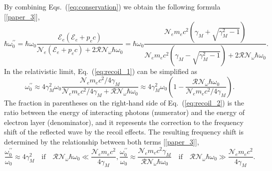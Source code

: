 \documentclass[10pt, a4paper, twoside, openright]{report}
\begin{document}
By combining Eqs.~(\ref{eq:conservation}) we obtain the following formula [\ref{paper_3}],
\begin{equation}\label{eq:recoil_1}
\hbar \omega_0^{\prime \prime} = \hbar \omega_0 \frac{\mathcal{E}_e \left( \mathcal{E}_e + p_e c \right)}{\mathcal{N}_e \left( \mathcal{E}_e + p_e c \right) + 2 \mathcal{R} \mathcal{N}_{\omega} \hbar \omega_0} = \hbar \omega_0 \frac{\mathcal{N}_e m_e c^2 \left( \gamma_M + \sqrt{\gamma_M^2 - 1} \right)}{\mathcal{N}_e m_e c^2 \left( \gamma_M - \sqrt{\gamma_M^2 - 1} \right) + 2 \mathcal{R} \mathcal{N}_{\omega} \hbar \omega_0}.
\end{equation}
In the relativistic limit, Eq.~(\ref{eq:recoil_1}) can be simplified as
\begin{equation}\label{eq:recoil_2}
\omega_0^{\prime \prime} \approx 4 \gamma_M^2 \omega_0 \frac{\mathcal{N}_e m_e c^2 / 4 \gamma_M}{\mathcal{N}_e m_e c^2 / 4 \gamma_M + \mathcal{R} \mathcal{N}_{\omega} \hbar \omega_0} \approx 4 \gamma_M^2 \omega_0 \left( 1 - \frac{\mathcal{R} \mathcal{N}_{\omega} \hbar \omega_0}{\mathcal{N}_e m_e c^2 / 4 \gamma_M} \right).
\end{equation}
The fraction in parentheses on the right-hand side of Eq.~(\ref{eq:recoil_2}) is the ratio between the energy of interacting photons (numerator) and the energy of electron layer (denominator), and it represents the correction to the frequency shift of the reflected wave by the recoil effects. The resulting frequency shift is determined by the relationship between both terms [\ref{paper_3}],
\begin{subequations}
\begin{equation}\label{eq:recoil_limit_1}
\frac{\omega_0^{\prime \prime}}{\omega_0} \approx 4 \gamma_M^2 \quad \mathrm{if} \quad \mathcal{R} \mathcal{N}_{\omega} \hbar \omega_0 \ll \frac{\mathcal{N}_e m_e c^2}{4 \gamma_M},
\end{equation}
\begin{equation}\label{eq:recoil_limit_2}
\frac{\omega_0^{\prime \prime}}{\omega_0} \approx \frac{\mathcal{N}_e m_e c^2 \gamma_M}{\mathcal{R} \mathcal{N}_{\omega} \hbar  \omega_0} \quad \mathrm{if} \quad \mathcal{R} \mathcal{N}_{\omega} \hbar \omega_0 \gg \frac{\mathcal{N}_e m_e c^2}{4 \gamma_M}. 
\end{equation}
\end{subequations}
\end{document}
